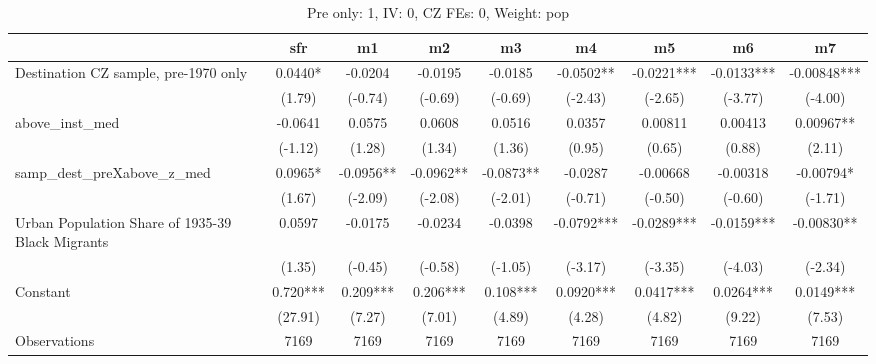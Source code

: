 \begin{table}[htbp]\centering
\def\sym#1{\ifmmode^{#1}\else\(^{#1}\)\fi}
\caption{Pre only: 1, IV: 0, CZ FEs: 0, Weight: pop}
\begin{tabular}{l*{8}{c}}
\toprule
                    &\multicolumn{1}{c}{sfr}&\multicolumn{1}{c}{m1}&\multicolumn{1}{c}{m2}&\multicolumn{1}{c}{m3}&\multicolumn{1}{c}{m4}&\multicolumn{1}{c}{m5}&\multicolumn{1}{c}{m6}&\multicolumn{1}{c}{m7}\\
\midrule
Destination CZ sample, pre-1970 only&      0.0440*  &     -0.0204   &     -0.0195   &     -0.0185   &     -0.0502** &     -0.0221***&     -0.0133***&    -0.00848***\\
                    &      (1.79)   &     (-0.74)   &     (-0.69)   &     (-0.69)   &     (-2.43)   &     (-2.65)   &     (-3.77)   &     (-4.00)   \\
\addlinespace
above\_inst\_med      &     -0.0641   &      0.0575   &      0.0608   &      0.0516   &      0.0357   &     0.00811   &     0.00413   &     0.00967** \\
                    &     (-1.12)   &      (1.28)   &      (1.34)   &      (1.36)   &      (0.95)   &      (0.65)   &      (0.88)   &      (2.11)   \\
\addlinespace
samp\_dest\_preXabove\_z\_med&      0.0965*  &     -0.0956** &     -0.0962** &     -0.0873** &     -0.0287   &    -0.00668   &    -0.00318   &    -0.00794*  \\
                    &      (1.67)   &     (-2.09)   &     (-2.08)   &     (-2.01)   &     (-0.71)   &     (-0.50)   &     (-0.60)   &     (-1.71)   \\
\addlinespace
Urban Population Share of 1935-39 Black Migrants&      0.0597   &     -0.0175   &     -0.0234   &     -0.0398   &     -0.0792***&     -0.0289***&     -0.0159***&    -0.00830** \\
                    &      (1.35)   &     (-0.45)   &     (-0.58)   &     (-1.05)   &     (-3.17)   &     (-3.35)   &     (-4.03)   &     (-2.34)   \\
\addlinespace
Constant            &       0.720***&       0.209***&       0.206***&       0.108***&      0.0920***&      0.0417***&      0.0264***&      0.0149***\\
                    &     (27.91)   &      (7.27)   &      (7.01)   &      (4.89)   &      (4.28)   &      (4.82)   &      (9.22)   &      (7.53)   \\
\midrule
Observations        &        7169   &        7169   &        7169   &        7169   &        7169   &        7169   &        7169   &        7169   \\

\end{tabular}
\end{table}
